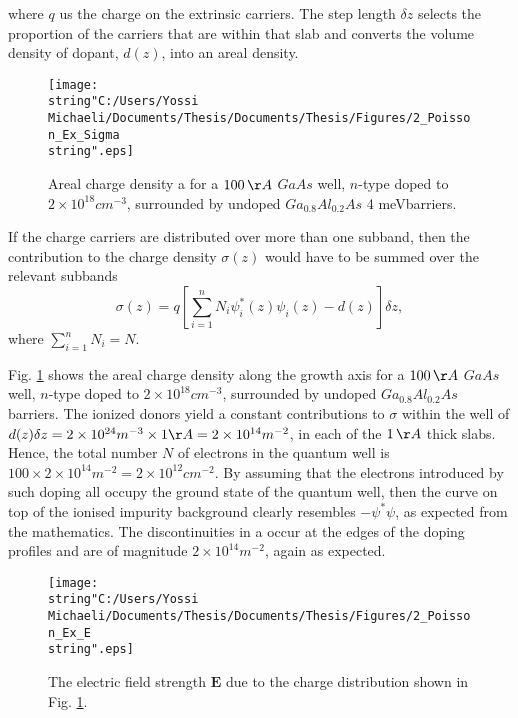 where $q$ us the charge on the extrinsic carriers. The step length
$\delta z$ selects the proportion of the carriers that are within
that slab and converts the volume density of dopant, $d(z)$, into
an areal density. %
\begin{figure}
\begin{centering}
\texttt{[image: \\string"C:/Users/Yossi Michaeli/Documents/Thesis/Documents/Thesis/Figures/2\_Poisson\_Ex\_Sigma\\string".eps]}
\par\end{centering}

\caption{\label{fig:Areal_charge_density_Ex}Areal charge density a for a $100\,\AA$
$GaAs$ well, $n$-type doped to $2\times10^{18}cm^{-3}$, surrounded
by undoped $Ga_{0.8}Al_{0.2}As$ 4 meVbarriers.}

\end{figure}


If the charge carriers are distributed over more than one subband,
then the contribution to the charge density $\sigma(z)$ would have
to be summed over the relevant subbands\begin{equation}
\sigma(z)=q\left[\sum_{i=1}^{n}N_{i}\psi_{i}^{*}(z)\psi_{i}(z)-d(z)\right]\delta z,\end{equation}
where $\sum_{i=1}^{n}N_{i}=N$.

Fig. \ref{fig:Areal_charge_density_Ex} shows the areal charge density
along the growth axis for a $100\,\AA$ $GaAs$ well, $n$-type doped
to $2\times10^{18}cm^{-3}$, surrounded by undoped $Ga_{0.8}Al_{0.2}As$
barriers. The ionized donors yield a constant contributions to $\sigma$
within the well of $d(z)\delta z=2\times10^{24}m^{-3}\times1\AA=2\times10^{14}m^{-2}$,
in each of the $1\,\AA$ thick slabs. Hence, the total number $N$
of electrons in the quantum well is $100\times2\times10^{14}m^{-2}=2\times10^{12}cm^{-2}.$
By assuming that the electrons introduced by such doping all occupy
the ground state of the quantum well, then the curve on top of the
ionised impurity background clearly resembles $-\psi^{*}\psi$, as
expected from the mathematics. The discontinuities in a occur at the
edges of the doping profiles and are of magnitude $2\times10^{14}m^{-2}$,
again as expected.%
\begin{figure}
\begin{centering}
\texttt{[image: \\string"C:/Users/Yossi Michaeli/Documents/Thesis/Documents/Thesis/Figures/2\_Poisson\_Ex\_E\\string".eps]}
\par\end{centering}

\caption{\label{fig:Poisson_Ex_E}The electric field strength $\mathbf{E}$
due to the charge distribution shown in Fig. \ref{fig:Areal_charge_density_Ex}.}



\end{figure}


